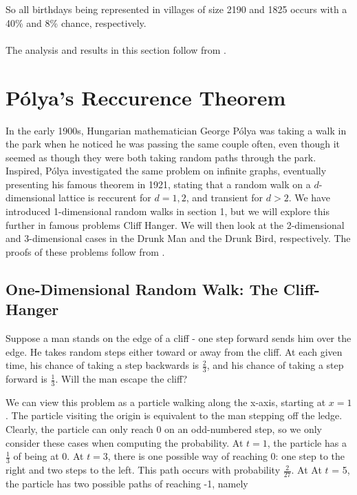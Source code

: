 \documentclass[11pt]{article}
\begin{document}
So all birthdays being represented in villages of size 2190 and 1825 occurs with a 40\% and 8\% chance, respectively.
\\ \\
The analysis and results in this section follow from  \cite{DK}.




\section{Pólya's Reccurence Theorem}

\indent \indent In the early 1900s, Hungarian mathematician George Pólya was taking a walk in the park when he noticed he was passing the same couple often, even though it seemed as though they were both taking random paths through the park. Inspired, Pólya investigated the same problem on infinite graphs, eventually presenting his famous theorem in 1921, stating that a random walk on a $d$-dimensional lattice is reccurent for $d = 1, 2$, and transient for $d > 2$. We have introduced 1-dimensional random walks in section 1, but we will explore this further in famous problems Cliff Hanger. We will then look at the 2-dimensional and 3-dimensional cases in the Drunk Man and the Drunk Bird, respectively. The proofs of these problems follow from \cite{50}.

\subsection{One-Dimensional Random Walk: The Cliff-Hanger}

\indent \indent Suppose a man stands on the edge of a cliff - one step forward sends him over the edge. He takes random steps either toward or away from the cliff. At each given time, his chance of taking a step backwards is $\frac{2}{3}$, and his chance of taking a step forward is $\frac{1}{3}$. Will the man escape the cliff? 

We can view this problem as a particle walking along the x-axis, starting at $x = 1$. The particle visiting the origin is equivalent to the man stepping off the ledge. Clearly, the particle can only reach $0$ on an odd-numbered step, so we only consider these cases when computing the probability. At $t = 1$, the particle has a  $\frac{1}{3}$ of being at $0$. At $t = 3$, there is one possible way of reaching $0$: one step to the right and two steps to the left. This path occurs with probability $\frac{2}{27}$. At At $t$ = 5, the particle has two possible paths of reaching -1, namely 
\end{document}
